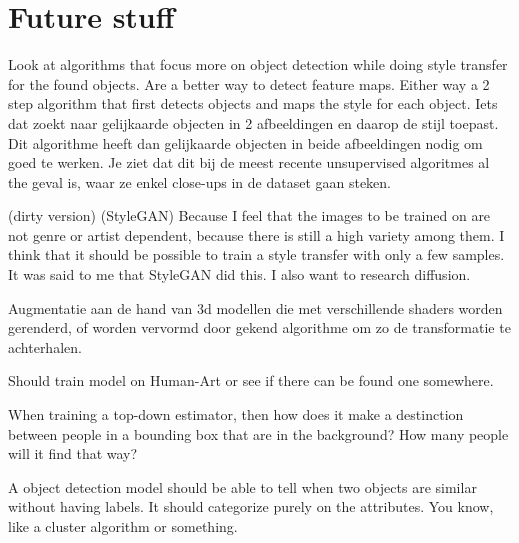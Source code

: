 \chapter{Future stuff}
Look at algorithms that focus more on object detection while doing style transfer for the found objects.
Are a better way to detect feature maps.
Either way a 2 step algorithm that first detects objects and maps the style for each object.
Iets dat zoekt naar gelijkaarde objecten in 2 afbeeldingen en daarop de stijl toepast.
Dit algorithme heeft dan gelijkaarde objecten in beide afbeeldingen nodig om goed te werken.
Je ziet dat dit bij de meest recente unsupervised algoritmes al the geval is, waar ze enkel close-ups in de dataset gaan steken.


(dirty version)
(StyleGAN) Because I feel that the images to be trained on are not genre or artist dependent, because there is still a high variety among them.
I think that it should be possible to train a style transfer with only a few samples.
It was said to me that StyleGAN did this.
I also want to research diffusion.

Augmentatie aan de hand van 3d modellen die met verschillende shaders worden gerenderd, of worden vervormd door gekend algorithme om zo de transformatie te achterhalen.

Should train model on Human-Art or see if there can be found one somewhere.

When training a top-down estimator, then how does it make a destinction between people in a bounding box that are in the background?
How many people will it find that way?

A object detection model should be able to tell when two objects are similar without having labels.
It should categorize purely on the attributes.
You know, like a cluster algorithm or something.